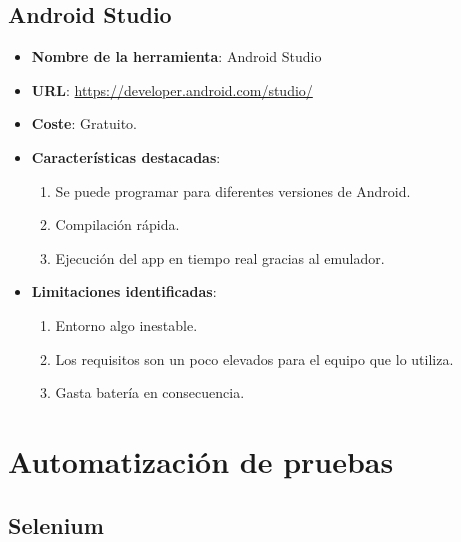 \subsection{Android Studio}

\begin{itemize}
	\item \textbf{Nombre de la herramienta}: Android Studio
	\item \textbf{URL}: \url{https://developer.android.com/studio/}
	\item \textbf{Coste}: Gratuito.
	\item \textbf{Características destacadas}: 
	\begin{enumerate}
		\item Se puede programar para diferentes versiones de Android.
		\item Compilación rápida.
		\item Ejecución del app en tiempo real gracias al emulador.
	\end{enumerate}
	\item \textbf{Limitaciones identificadas}:
	\begin{enumerate}
		\item Entorno algo inestable.
		\item Los requisitos son un poco elevados para el equipo que lo utiliza.
		\item Gasta batería en consecuencia.
	\end{enumerate}
\end{itemize}

\section{Automatización de pruebas}

\subsection{Selenium}

